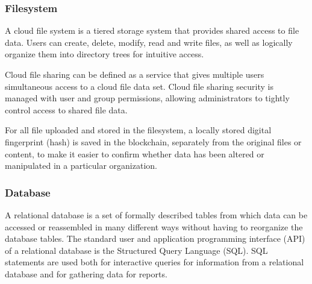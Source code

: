 \subsubsection{Filesystem}\label{sec:Filesystem}
A cloud file system is a tiered storage system that provides shared access to file data. Users can create, delete, modify, read and write files, as well as logically organize them into directory trees for intuitive access.

Cloud file sharing can be defined as a service that gives multiple users simultaneous access to a cloud file data set. Cloud file sharing security is managed with user and group permissions, allowing administrators to tightly control access to shared file data.

For all file uploaded and stored in the filesystem, a locally stored digital fingerprint (hash) is saved in the blockchain, separately from the original files or content, to make it easier to confirm whether data has been altered or manipulated in a particular organization.

\subsubsection{Database}\label{sec:Database}
A relational database is a set of formally described tables from which data can be accessed or reassembled in many different ways without having to reorganize the database tables. The standard user and application programming interface (API) of a relational database is the Structured Query Language (SQL). SQL statements are used both for interactive queries for information from a relational database and for gathering data for reports.
